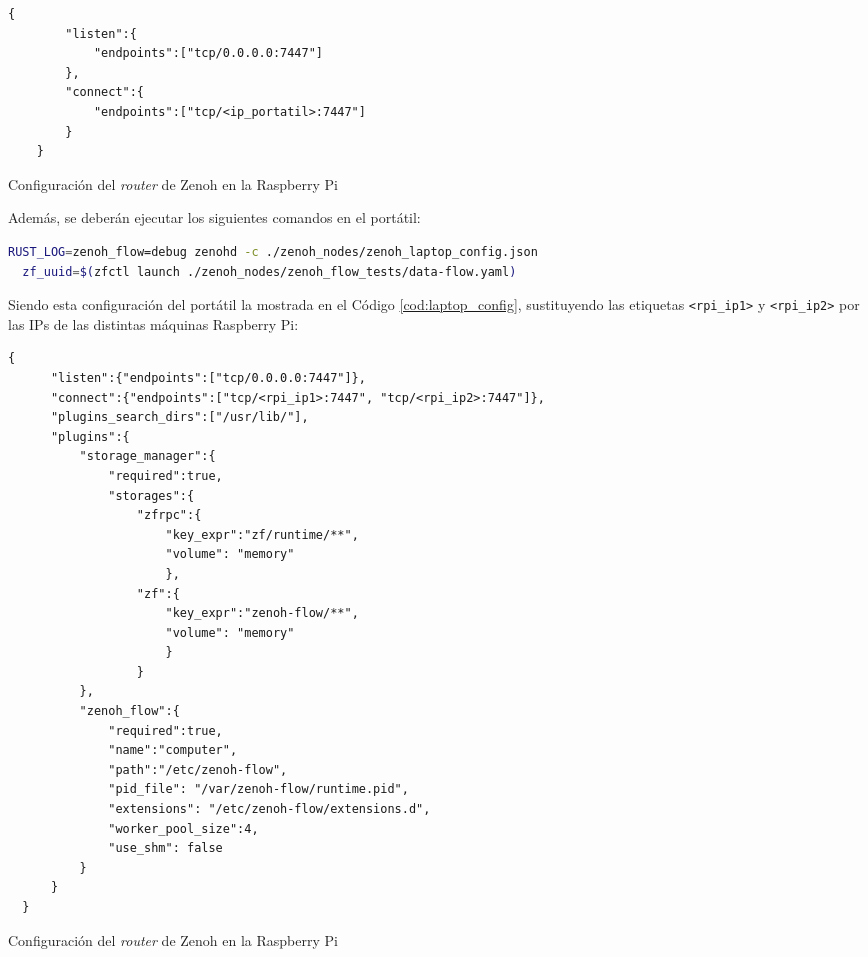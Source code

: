 \begin{code}[h!]
  \begin{lstlisting}[style=json]
    {
        "listen":{
            "endpoints":["tcp/0.0.0.0:7447"]
        },
        "connect":{
            "endpoints":["tcp/<ip_portatil>:7447"]
        }
    }
  \end{lstlisting}
\caption[Configuración del \textit{router} de Zenoh en la Raspberry Pi]{Configuración del \textit{router} de Zenoh en la Raspberry Pi}
\label{cod:rpi_config}
\end{code}


Además, se deberán ejecutar los siguientes comandos en el portátil:
\begin{lstlisting}[language=bash]
  RUST_LOG=zenoh_flow=debug zenohd -c ./zenoh_nodes/zenoh_laptop_config.json
  zf_uuid=$(zfctl launch ./zenoh_nodes/zenoh_flow_tests/data-flow.yaml)
\end{lstlisting}

Siendo esta configuración del portátil la mostrada en el Código
\ref{cod:laptop_config}, sustituyendo las etiquetas \verb|<rpi_ip1>| y
\verb|<rpi_ip2>| por las IPs de las distintas máquinas Raspberry Pi:
\\

\begin{code}[h!]
  \begin{lstlisting}[style=json]
    {
      "listen":{"endpoints":["tcp/0.0.0.0:7447"]},
      "connect":{"endpoints":["tcp/<rpi_ip1>:7447", "tcp/<rpi_ip2>:7447"]},
      "plugins_search_dirs":["/usr/lib/"],
      "plugins":{
          "storage_manager":{
              "required":true,
              "storages":{
                  "zfrpc":{
                      "key_expr":"zf/runtime/**",
                      "volume": "memory"
                      },
                  "zf":{
                      "key_expr":"zenoh-flow/**",
                      "volume": "memory"
                      }
                  }
          },
          "zenoh_flow":{
              "required":true,
              "name":"computer",
              "path":"/etc/zenoh-flow",
              "pid_file": "/var/zenoh-flow/runtime.pid",
              "extensions": "/etc/zenoh-flow/extensions.d",
              "worker_pool_size":4,
              "use_shm": false
          }
      }
  }
  \end{lstlisting}
\caption[Configuración del \textit{router} de Zenoh en la Raspberry Pi]{Configuración del \textit{router} de Zenoh en la Raspberry Pi}
\label{cod:laptop_config}
\end{code}

